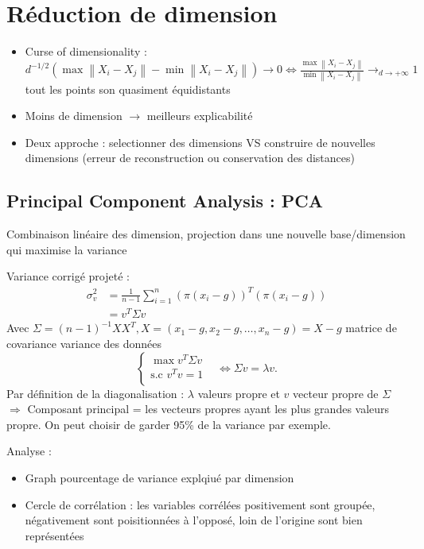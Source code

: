 \documentclass{article}
\theoremstyle{plain}%
\theoremstyle{definition}
\theoremstyle{remark}
\begin{document}
\section{Réduction de dimension}
\begin{itemize}
    \item Curse of dimensionality : $ d^{-1/2} (\max \left\| X_i - X_j \right\| - \min \left\| X_i - X_j \right\| ) \to 0 \Leftrightarrow \frac{\max \left\| X_i - X_j \right\| }{\min \left\| X_i - X_j \right\| } \to_{d \to + \infty } 1 $ tout les points son quasiment équidistants  
    \item Moins de dimension $\rightarrow$ meilleurs explicabilité
    \item Deux approche : selectionner des dimensions VS construire de nouvelles dimensions (erreur de reconstruction ou conservation des distances)
\end{itemize}

\subsection{Principal Component Analysis : PCA}
Combinaison linéaire des dimension, projection dans une nouvelle base/dimension qui maximise la variance

Variance corrigé projeté : \begin{align*}
    \sigma _v^2 &= \frac{1}{n-1}\sum_{i=1}^{n}(\pi (x_i - g))^T (\pi (x_i - g)) \\
    &= v^T \Sigma v
\end{align*}
Avec $ \Sigma = (n-1)^{-1} X X^T, X = (x_1 - g, x_2 - g, \dots, x_n - g) = X - g$ matrice de covariance variance des données
\[
    \begin{cases}
    \max v^T \Sigma v &\text{}\\
    \text{s.c } v^T v = 1\\
    \end{cases} \Leftrightarrow \Sigma v = \lambda v
.\]
Par définition de la diagonalisation : $ \lambda $ valeurs propre et $ v $ vecteur propre de $ \Sigma  $ \\
$\Rightarrow $ Composant principal = les vecteurs propres ayant les plus grandes valeurs propre. On peut choisir de garder 95\% de la variance par exemple.

Analyse : \begin{itemize}
    \item Graph pourcentage de variance explqiué par dimension
    \item Cercle de corrélation : les variables corrélées positivement sont groupée, négativement sont poisitionnées à l'opposé, loin de l'origine sont bien représentées
\end{itemize}
\end{document}
